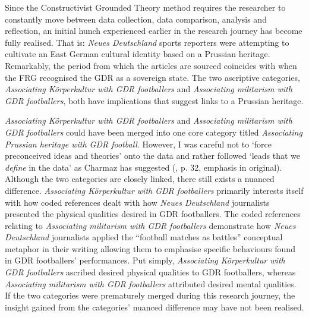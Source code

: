 Since the Constructivist Grounded Theory method requires the researcher to constantly move between data collection, data comparison, analysis and reflection, an initial hunch experienced earlier in the research journey has become fully realised. That is: \textit{Neues Deutschland} sports reporters were attempting to cultivate an East German cultural identity based on a Prussian heritage. Remarkably, the period from which the articles are sourced coincides with when the FRG recognised the GDR as a sovereign state. The two ascriptive categories, \textit{Associating Körperkultur with GDR footballers} and \textit{Associating militarism with GDR footballers}, both have implications that suggest links to a Prussian heritage.

\textit{Associating Körperkultur with GDR footballers} and \textit{Associating militarism with GDR footballers} could have been merged into one core category titled \textit{Associating Prussian heritage with GDR football}. However, I was careful not to ‘force preconceived ideas and theories’ onto the data and rather followed ‘leads that we \textit{define} in the data’ as Charmaz has suggested (\citeyear{charmaz2014}, p. 32, emphasis in original). Although the two categories are closely linked, there still exists a nuanced difference. \textit{Associating Körperkultur with GDR footballers} primarily interests itself with how coded references dealt with how \textit{Neues Deutschland} journalists presented the physical qualities desired in GDR footballers. The coded references relating to \textit{Associating militarism with GDR footballers} demonstrate how \textit{Neues Deutschland} journalists applied the “football matches as battles” conceptual metaphor in their writing allowing them to emphasise specific behaviours found in GDR footballers’ performances. Put simply, \textit{Associating Körperkultur with GDR footballers} ascribed desired physical qualities to GDR footballers, whereas \textit{Associating militarism with GDR footballers} attributed desired mental qualities. If the two categories were prematurely merged during this research journey, the insight gained from the categories’ nuanced difference may have not been realised.

